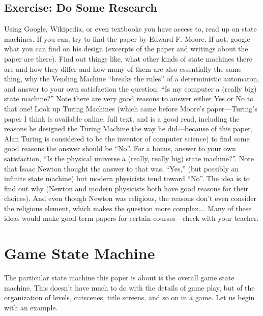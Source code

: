 \subsection[Exercise: Do Some
Research]{\texorpdfstring{\protect\hypertarget{anchor-6}{}{}Exercise: Do
Some
Research}{Exercise: Do Some Research}}\label{exercise-do-some-research}

Using Google, Wikipedia, or even textbooks you have access to, read up
on state machines. If you can, try to find the paper by Edward F. Moore.
If not, google what you can find on his design (excerpts of the paper
and writings about the paper are there). Find out things like, what
other kinds of state machines there are and how they differ and how many
of them are also essentially the same thing, why the Vending Machine
``breaks the rules'' of a deterministic automaton, and answer to your
own satisfaction the question: ``Is my computer a (really big) state
machine?'' Note there are very good reasons to answer either Yes or No
to that one! Look up Turing Machines (which came before Moore's
paper---Turing's paper I think is available online, full text, and is a
good read, including the reasons he designed the Turing Machine the way
he did---because of this paper, Alan Turing is considered to be the
inventor of computer science) to find some good reasons the answer
should be ``No''. For a bonus, answer to your own satisfaction, ``Is the
physical universe a (really, really big) state machine?''. Note that
Isaac Newton thought the answer to that was, ``Yes,'' (but possibly an
infinite state machine) but modern physicists tend toward ``No''. The
idea is to find out why (Newton and modern physicists both have good
reasons for their choices). And even though Newton was religious, the
reasons don't even consider the religious element, which makes the
question more complex\ldots{}. Many of these ideas would make good term
papers for certain courses---check with your teacher.

\section[Game State
Machine]{\texorpdfstring{\protect\hypertarget{anchor-7}{}{}Game State
Machine}{Game State Machine}}\label{game-state-machine}

The particular state machine this paper is about is the overall game
state machine. This doesn't have much to do with the details of game
play, but of the organization of levels, cutscenes, title screens, and
so on in a game. Let us begin with an example.

